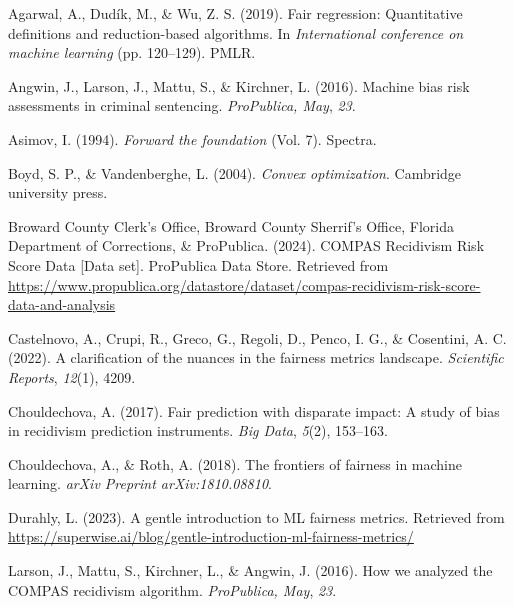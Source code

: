 \documentclass[12pt, twoside]{amherstthesis}
\newenvironment{CSLReferences}[2]%
  {}%
  {\par}
\begin{document}
\hypertarget{refs}{}
\begin{CSLReferences}{1}{0}
\leavevmode{}%
Agarwal, A., Dudík, M., \& Wu, Z. S. (2019). Fair regression: Quantitative definitions and reduction-based algorithms. In \emph{International conference on machine learning} (pp. 120--129). PMLR.

\leavevmode{}%
Angwin, J., Larson, J., Mattu, S., \& Kirchner, L. (2016). Machine bias risk assessments in criminal sentencing. \emph{ProPublica, May}, \emph{23}.

\leavevmode{}%
Asimov, I. (1994). \emph{Forward the foundation} (Vol. 7). Spectra.

\leavevmode{}%
Boyd, S. P., \& Vandenberghe, L. (2004). \emph{Convex optimization}. Cambridge university press.

\leavevmode{}%
Broward County Clerk's Office, Broward County Sherrif's Office, Florida Department of Corrections, \& ProPublica. (2024). {COMPAS Recidivism Risk Score Data} {[}Data set{]}. ProPublica Data Store. Retrieved from \url{https://www.propublica.org/datastore/dataset/compas-recidivism-risk-score-data-and-analysis}

\leavevmode{}%
Castelnovo, A., Crupi, R., Greco, G., Regoli, D., Penco, I. G., \& Cosentini, A. C. (2022). A clarification of the nuances in the fairness metrics landscape. \emph{Scientific Reports}, \emph{12}(1), 4209.

\leavevmode{}%
Chouldechova, A. (2017). Fair prediction with disparate impact: A study of bias in recidivism prediction instruments. \emph{Big Data}, \emph{5}(2), 153--163.

\leavevmode{}%
Chouldechova, A., \& Roth, A. (2018). The frontiers of fairness in machine learning. \emph{arXiv Preprint arXiv:1810.08810}.

\leavevmode{}%
Durahly, L. (2023). A gentle introduction to ML fairness metrics. Retrieved from \url{https://superwise.ai/blog/gentle-introduction-ml-fairness-metrics/}

\leavevmode{}%
Larson, J., Mattu, S., Kirchner, L., \& Angwin, J. (2016). How we analyzed the COMPAS recidivism algorithm. \emph{ProPublica, May}, \emph{23}.


\end{CSLReferences}
\end{document}
